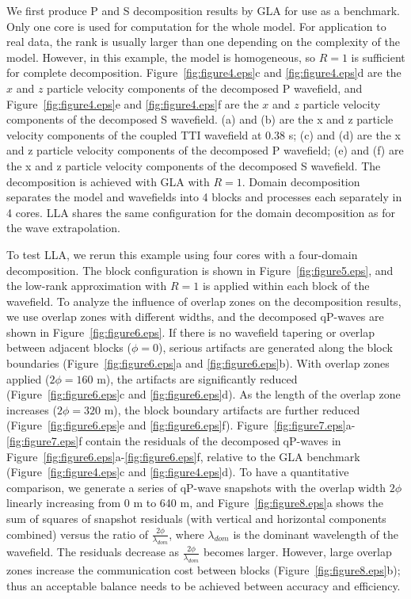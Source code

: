 \documentclass[manuscript,ulem,graphix,revised]{geophysics}
\begin{document}
We first produce P and S decomposition results by GLA for use as a benchmark. Only one core is used for computation for the whole model. For application to real data, the rank is usually larger than one depending on the complexity of the model. However, in this example, the model is homogeneous, so $R=1$ is sufficient for complete decomposition.
Figure~\ref{fig:figure4.eps}c and \ref{fig:figure4.eps}d are the $x$ and $z$ particle velocity components of the decomposed P wavefield, and Figure~\ref{fig:figure4.eps}e and \ref{fig:figure4.eps}f are the $x$ and $z$ particle velocity components of the decomposed S wavefield.
{(a) and (b) are the x and z particle velocity components of the coupled TTI wavefield at 0.38 s; (c) and (d) are the x and z particle velocity components of the decomposed P wavefield; (e) and (f) are the x and z particle velocity components of the decomposed S wavefield. The decomposition is achieved with GLA with $R=1$.}
{
Domain decomposition separates the model and wavefields into 4 blocks and processes each separately in 4 cores. LLA shares the same configuration for the domain decomposition as for the wave extrapolation.
}

To test LLA, we rerun this example using four cores with a four-domain decomposition. The block configuration is shown in Figure~\ref{fig:figure5.eps}, and the low-rank approximation with $R=1$ is applied within each block of the wavefield. To analyze the influence of overlap zones on the decomposition results, we use overlap zones with different widths, and the decomposed qP-waves are shown in Figure~\ref{fig:figure6.eps}. If there is no wavefield tapering or overlap between adjacent blocks ($\phi=0$), serious artifacts are generated along the block boundaries (Figure~\ref{fig:figure6.eps}a and \ref{fig:figure6.eps}b). With overlap zones applied ($2\phi=160$ m), the artifacts are significantly reduced (Figure~\ref{fig:figure6.eps}c and \ref{fig:figure6.eps}d). As the length of the overlap zone increases ($2\phi=320$ m), the block boundary artifacts are further reduced (Figure~\ref{fig:figure6.eps}e and \ref{fig:figure6.eps}f). Figure~\ref{fig:figure7.eps}a-\ref{fig:figure7.eps}f contain the residuals of the decomposed qP-waves in Figure~\ref{fig:figure6.eps}a-\ref{fig:figure6.eps}f, relative to the GLA benchmark (Figure~\ref{fig:figure4.eps}c and \ref{fig:figure4.eps}d). 
To have a quantitative comparison, we generate a series of qP-wave snapshots with the overlap width $2\phi$ linearly increasing from 0 m to 640 m, and Figure~\ref{fig:figure8.eps}a shows the sum of squares of snapshot residuals (with vertical and horizontal components combined) versus the ratio of $\frac{2\phi}{\lambda_{dom}}$, where $\lambda_{dom}$ is the dominant wavelength of the wavefield. The residuals decrease as $\frac{2\phi}{\lambda_{dom}}$ becomes larger.
However, large overlap zones increase the communication cost between blocks (Figure~\ref{fig:figure8.eps}b); thus an acceptable balance needs to be achieved between accuracy and efficiency.
\end{document}

